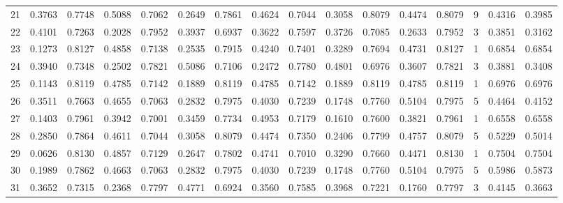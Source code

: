 \begin{tabular}{lrrrrrrrrrrrrrrr}
21  &      0.3763 &  0.7748 &  0.5088 &  0.7062 &  0.2649 &  0.7861 &  0.4624 &  0.7044 &  0.3058 &  0.8079 &   0.4474 &     0.8079 &      9 &                    0.4316 &                     0.3985 \\
22  &      0.4101 &  0.7263 &  0.2028 &  0.7952 &  0.3937 &  0.6937 &  0.3622 &  0.7597 &  0.3726 &  0.7085 &   0.2633 &     0.7952 &      3 &                    0.3851 &                     0.3162 \\
23  &      0.1273 &  0.8127 &  0.4858 &  0.7138 &  0.2535 &  0.7915 &  0.4240 &  0.7401 &  0.3289 &  0.7694 &   0.4731 &     0.8127 &      1 &                    0.6854 &                     0.6854 \\
24  &      0.3940 &  0.7348 &  0.2502 &  0.7821 &  0.5086 &  0.7106 &  0.2472 &  0.7780 &  0.4801 &  0.6976 &   0.3607 &     0.7821 &      3 &                    0.3881 &                     0.3408 \\
25  &      0.1143 &  0.8119 &  0.4785 &  0.7142 &  0.1889 &  0.8119 &  0.4785 &  0.7142 &  0.1889 &  0.8119 &   0.4785 &     0.8119 &      1 &                    0.6976 &                     0.6976 \\
26  &      0.3511 &  0.7663 &  0.4655 &  0.7063 &  0.2832 &  0.7975 &  0.4030 &  0.7239 &  0.1748 &  0.7760 &   0.5104 &     0.7975 &      5 &                    0.4464 &                     0.4152 \\
27  &      0.1403 &  0.7961 &  0.3942 &  0.7001 &  0.3459 &  0.7734 &  0.4953 &  0.7179 &  0.1610 &  0.7600 &   0.3821 &     0.7961 &      1 &                    0.6558 &                     0.6558 \\
28  &      0.2850 &  0.7864 &  0.4611 &  0.7044 &  0.3058 &  0.8079 &  0.4474 &  0.7350 &  0.2406 &  0.7799 &   0.4757 &     0.8079 &      5 &                    0.5229 &                     0.5014 \\
29  &      0.0626 &  0.8130 &  0.4857 &  0.7129 &  0.2647 &  0.7802 &  0.4741 &  0.7010 &  0.3290 &  0.7660 &   0.4471 &     0.8130 &      1 &                    0.7504 &                     0.7504 \\
30  &      0.1989 &  0.7862 &  0.4663 &  0.7063 &  0.2832 &  0.7975 &  0.4030 &  0.7239 &  0.1748 &  0.7760 &   0.5104 &     0.7975 &      5 &                    0.5986 &                     0.5873 \\
31  &      0.3652 &  0.7315 &  0.2368 &  0.7797 &  0.4771 &  0.6924 &  0.3560 &  0.7585 &  0.3968 &  0.7221 &   0.1760 &     0.7797 &      3 &                    0.4145 &                     0.3663 \\

\end{tabular}
